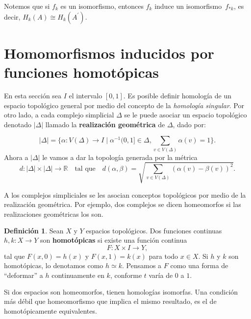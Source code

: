 \documentclass[12pt]{book}
\newtheorem{theorem}{Teorema}[section]
\theoremstyle{definition}
\newtheorem{definition}[theorem]{Definición}
\newcounter{in}
\newcounter{ini}
\begin{document}
Notemos que si $f_{k}$ es un isomorfismo, entonces $f_{k}$ induce un
isomorfismo~$f_{*k}$, es decir, $H_{k}(A)\cong H_{k}(A^{'})$.

\section[Homomorfismos inducidos]{Homomorfismos inducidos por funciones homotópicas}
\label{hom-ind}

En esta sección sea $I$ el intervalo $[0,1]$. Es posible definir homología de un espacio topológico general por
medio del concepto de la \emph{homología singular}. Por otro lado, a cada complejo
simplicial $\Delta$ se le puede asociar un espacio topológico denotado $|\Delta|$
llamado la \textbf{realización geométrica} de $\Delta$, dado por:

$$|\Delta|=\{\alpha:V(\Delta)\rightarrow I\mid\alpha^{-1}(0,1]\in
\Delta, \sum _{v\in V(\Delta)}\alpha(v)=1\}.$$
Ahora a $|\Delta|$ le vamos a dar la topología generada por la métrica
\begin{equation*}
  \label{metrica}
  d:|\Delta|\times |\Delta|\rightarrow  \mathbb{R} \quad \mbox{tal
    que}\quad d(\alpha,\beta)=\sqrt{\sum _{v\in V(\Delta)}(\alpha(v)-\beta(v))^{2}}.
\end{equation*}

A los complejos simpliciales se les asocian conceptos topológicos por
medio de la realización geométrica. Por ejemplo, dos complejos se
dicen homeomorfos si las realizaciones geométricas los son.

\begin{definition}
  Sean $X$ y $Y$ espacios topológicos. Dos funciones continuas
  $h,k:X\rightarrow Y$ son \textbf{homotópicas} si existe una función continua
  $$F:X\times I\rightarrow Y,$$
  tal que $F(x,0)=h(x)$ y $F(x,1)=k(x)$ para todo $x\in X.$ Si $h$ y
  $k$ son homotópicas, lo denotamos como $h\simeq k$. Pensamos a $F$
  como una forma de ``deformar'' a $h$ continuamente en $k$, conforme
  $t$ varía de $0$ a $1$.
\end{definition}


Si dos espacios son homeomorfos, tienen homologías isomorfas. Una
condición más débil que homeomorfismo que implica el mismo resultado,
es el de homotópicamente equivalentes.
 
\end{document}

